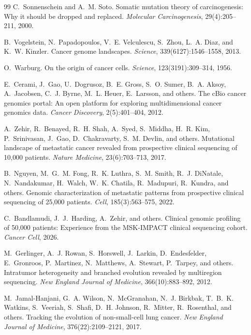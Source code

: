 \documentclass[11pt]{article}
\begin{document}
\begin{thebibliography}{99}
C.~Sonnenschein and A.~M. Soto.
\newblock Somatic mutation theory of carcinogenesis: Why it should be dropped
  and replaced.
\newblock \emph{Molecular Carcinogenesis}, 29(4):205--211, 2000.

B.~Vogelstein, N.~Papadopoulos, V.~E. Velculescu, S.~Zhou, L.~A. Diaz, and
  K.~W. Kinzler.
\newblock Cancer genome landscapes.
\newblock \emph{Science}, 339(6127):1546--1558, 2013.

O.~Warburg.
\newblock On the origin of cancer cells.
\newblock \emph{Science}, 123(3191):309--314, 1956.

E.~Cerami, J.~Gao, U.~Dogrusoz, B.~E. Gross, S.~O. Sumer,
  B.~A. Aksoy, A.~Jacobsen, C.~J. Byrne, M.~L. Heuer,
  E.~Larsson, and others.
\newblock The {cBio} cancer genomics portal: An open platform for
  exploring multidimensional cancer genomics data.
\newblock \emph{Cancer Discovery}, 2(5):401--404, 2012.

A.~Zehir, R.~Benayed, R.~H. Shah, A.~Syed, S.~Middha,
  H.~R. Kim, P.~Srinivasan, J.~Gao, D.~Chakravarty,
  S.~M. Devlin, and others.
\newblock Mutational landscape of metastatic cancer revealed from
  prospective clinical sequencing of 10,000 patients.
\newblock \emph{Nature Medicine}, 23(6):703--713, 2017.

B.~Nguyen, M.~G.~M. Fong, R.~K. Luthra, S.~M. Smith,
  R.~J. DiNatale, N.~Nandakumar, H.~Walch, W.~K. Chatila,
  R.~Madupuri, R.~Kundra, and others.
\newblock Genomic characterization of metastatic patterns from
  prospective clinical sequencing of 25,000 patients.
\newblock \emph{Cell}, 185(3):563--575, 2022.

C.~Bandlamudi, J.~J.~Harding, A.~Zehir, and others.
\newblock Clinical genomic profiling of 50,000 patients:
  Experience from the {MSK-IMPACT} clinical sequencing cohort.
\newblock \emph{Cancer Cell}, 2026.

M.~Gerlinger, A.~J. Rowan, S.~Horswell, J.~Larkin, D.~Endesfelder,
  E.~Gronroos, P.~Martinez, N.~Matthews, A.~Stewart, P.~Tarpey, and others.
\newblock Intratumor heterogeneity and branched evolution revealed by
  multiregion sequencing.
\newblock \emph{New England Journal of Medicine}, 366(10):883--892, 2012.

M.~Jamal-Hanjani, G.~A. Wilson, N.~McGranahan, N.~J. Birkbak,
  T.~B.~K. Watkins, S.~Veeriah, S.~Shafi, D.~H. Johnson,
  R.~Mitter, R.~Rosenthal, and others.
\newblock Tracking the evolution of non-small-cell lung cancer.
\newblock \emph{New England Journal of Medicine}, 376(22):2109--2121, 2017.


\end{thebibliography}
\end{document}
